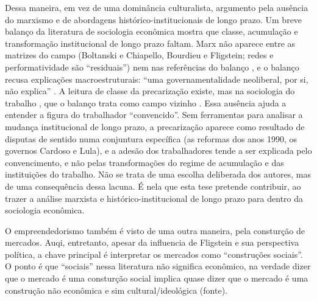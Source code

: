 Dessa maneira, em vez de uma dominância culturalista, argumento pela ausência do marxismo e de abordagens histórico-institucionais de longo prazo. Um breve balanço da literatura de sociologia econômica mostra que classe, acumulação e transformação institucional de longo prazo faltam. Marx não aparece entre as matrizes do campo (Boltanski e Chiapello, Bourdieu e Fligstein; redes e performatividade são ``residuais'') \citep[p.~34-37]{veretanahoum_sociologia_2017} nem nas referências do balanço \citep[p.~76-86]{veretanahoum_sociologia_2017}, e o balanço recusa explicações macroestruturais: ``uma governamentalidade neoliberal, por si, não explica'' \citep[p.~73]{veretanahoum_sociologia_2017}. A leitura de classe da precarização existe, mas na sociologia do trabalho \citep{filgueiras_plataformas_2020, braga_politica_2012, druck_trabalho_2011, marcelino_o_2020}, que o balanço trata como campo vizinho \citep[p.~24-25, 57-58]{veretanahoum_sociologia_2017}. Essa ausência ajuda a entender a figura do trabalhador ``convencido''. Sem ferramentas para analisar a mudança institucional de longo prazo, a precarização aparece como resultado de disputas de sentido numa conjuntura específica (as reformas dos anos 1990, os governos Cardoso e Lula), e a adesão dos trabalhadores tende a ser explicada pelo convencimento, e não pelas transformações do regime de acumulação e das instituições do trabalho. Não se trata de uma escolha deliberada dos autores, mas de uma consequência dessa lacuna. É nela que esta tese pretende contribuir, ao trazer a análise marxista e histórico-institucional de longo prazo para dentro da sociologia econômica.

O empreendedorismo também é visto de uma outra maneira, pela consturção de mercados. Auqi, entretanto, apesar da influencia de Fligstein e sua perspectiva política, a chave principal é interpretar os mercados como ``construções sociais''. O ponto é que ``sociais'' nessa literatura não significa econômico, na verdade dizer que o mercado é uma consturção social implica quase dizer que o mercado é uma construção não econômica e sim cultural/ideológica (fonte).


